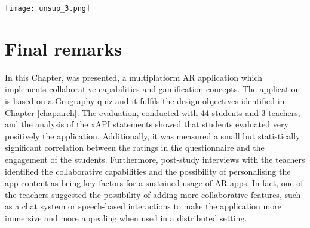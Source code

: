 \begin{figure*}[htbp]
    \centering
    \texttt{[image: unsup\_3.png]}
    \caption{\fontsize{10pt}{11pt}}
    \label{fig:clustering}
\end{figure*}

\section{Final remarks}\label{eval:conclusion}

In this Chapter, \appname{} was presented, a multiplatform AR application which implements collaborative capabilities and gamification concepts. The application is based on a Geography quiz and it fulfils the design objectives identified in Chapter \ref{chap:arch}.
The evaluation, conducted with 44 students and 3 teachers, and the analysis of the xAPI statements showed that students evaluated very positively the application.
Additionally, it was measured a small but statistically significant correlation between the ratings in the questionnaire and the engagement of the students. Furthermore, post-study interviews with the teachers identified the collaborative capabilities and the possibility of personalising the app content as being key factors for a sustained usage of AR apps.
In fact, one of the teachers suggested the possibility of adding more collaborative features, such as a chat system or speech-based interactions to make the application more immersive and more appealing when used in a distributed setting.



